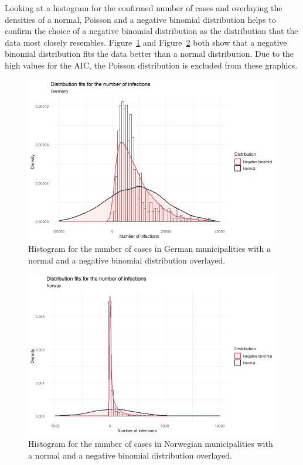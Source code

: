 Looking at a histogram for the confirmed number of cases and overlaying the densities of a normal, Poisson and a negative binomial distribution helps to confirm the choice of a negative binomial distribution as the distribution that the data most closely resembles. Figure~\ref{fitDistrGermany} and Figure~\ref{fitDistrNorway} both show that a negative binomial distribution fits the data better than a normal distribution. Due to the high values for the AIC, the Poisson distribution is excluded from these graphics.
\begin{figure}[H]
  \centering
  \includegraphics[width = \textwidth]{distrfit_germany.png}  
  \caption{Histogram for the number of cases in German municipalities with a normal and a negative binomial distribution overlayed.}
  \label{fitDistrGermany}
\end{figure}
\begin{figure}[H]
  \centering
  \includegraphics[width = \textwidth]{distrfit_norway.png}
  \caption{Histogram for the number of cases in Norwegian municipalities with a normal and a negative binomial distribution overlayed.}
  \label{fitDistrNorway}
\end{figure}
\clearpage
